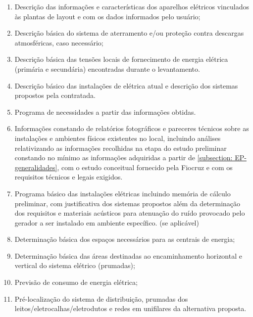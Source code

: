 \begin{enumerate}
\begin{enumerate}
			\item Descrição das informações e características dos aparelhos elétricos vinculados às plantas de layout e com os dados informados pelo usuário; 			

			\item Descrição básica do sistema de aterramento e/ou proteção contra descargas atmosféricas, caso necessário;

			\item Descrição básica das tensões locais de fornecimento de energia elétrica (primária e secundária) encontradas durante o levantamento.
			
			\item Descrição básico das instalações de elétrica atual e descrição dos sistemas propostos pela contratada.
			
			\item Programa de necessidades a partir das informações obtidas.

			\item Informações constando de relatórios fotográficos e pareceres técnicos sobre as instalações e ambientes físicos existentes no local, incluindo análises relativizando as informações recolhidas na etapa do estudo preliminar constando no mínimo as informações adquiridas a partir de \ref{subsection: EP-generalidades}, com o estudo conceitual fornecido pela Fiocruz e com os requisitos técnicos e legais exigidos.
			
			\item Programa básico das instalações elétricas incluindo memória de cálculo preliminar, com justificativa dos sistemas propostos além da determinação dos requisitos e materiais acústicos para atenuação do ruído provocado pelo gerador a ser instalado em ambiente específico. (se aplicável)			
			
			\item Determinação básica dos espaços necessários para as centrais de energia;
			
			\item Determinação básica das áreas destinadas ao encaminhamento horizontal e vertical do sistema elétrico (prumadas);
			
			\item Previsão de consumo de energia elétrica;
			
			\item Pré-localização do sistema de distribuição, prumadas dos leitos/eletrocalhas/eletrodutos e redes em unifilares da alternativa proposta.


\end{enumerate}
\end{enumerate}
